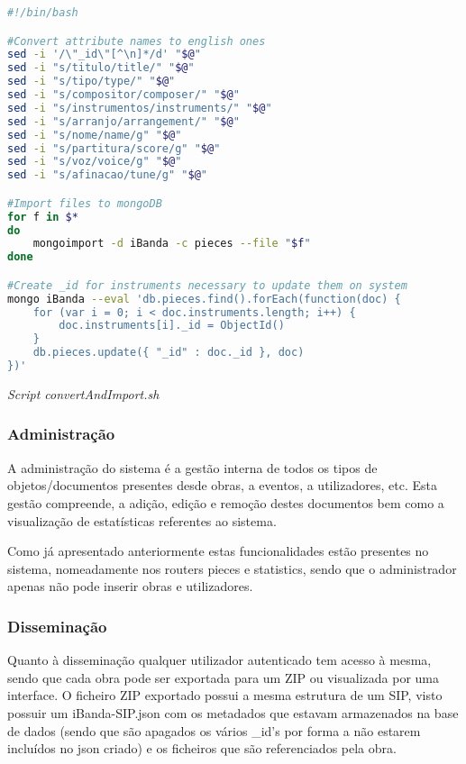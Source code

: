 \begin{framed}
\begin{lstlisting}[language=bash]
#!/bin/bash

#Convert attribute names to english ones
sed -i '/\"_id\"[^\n]*/d' "$@"
sed -i "s/titulo/title/" "$@"
sed -i "s/tipo/type/" "$@"
sed -i "s/compositor/composer/" "$@"
sed -i "s/instrumentos/instruments/" "$@"
sed -i "s/arranjo/arrangement/" "$@"
sed -i "s/nome/name/g" "$@"
sed -i "s/partitura/score/g" "$@"
sed -i "s/voz/voice/g" "$@"
sed -i "s/afinacao/tune/g" "$@"

#Import files to mongoDB
for f in $* 
do
    mongoimport -d iBanda -c pieces --file "$f"
done

#Create _id for instruments necessary to update them on system
mongo iBanda --eval 'db.pieces.find().forEach(function(doc) {
    for (var i = 0; i < doc.instruments.length; i++) {
        doc.instruments[i]._id = ObjectId()
    }
    db.pieces.update({ "_id" : doc._id }, doc)
})'
\end{lstlisting}
\end{framed}
\begin{center}
\textit{Script convertAndImport.sh}
\end{center}

\subsubsection{Administração}
A administração do sistema é a gestão interna de todos os tipos de objetos/documentos presentes desde obras, a eventos, a utilizadores, etc. Esta gestão compreende, a adição, edição e remoção destes documentos bem como a visualização de estatísticas referentes ao sistema.

Como já apresentado anteriormente estas funcionalidades estão presentes no sistema, nomeadamente nos routers pieces e statistics, sendo que o administrador apenas não pode inserir obras e utilizadores.

\subsubsection{Disseminação}
Quanto à disseminação qualquer utilizador autenticado tem acesso à mesma, sendo que cada obra pode ser exportada para um ZIP ou visualizada por uma interface. O ficheiro ZIP exportado possui a mesma estrutura de um SIP, visto possuir um iBanda-SIP.json com os metadados que estavam armazenados na base de dados (sendo que são apagados os vários \_id's por forma a não estarem incluídos no json criado) e os ficheiros que são referenciados pela obra.

